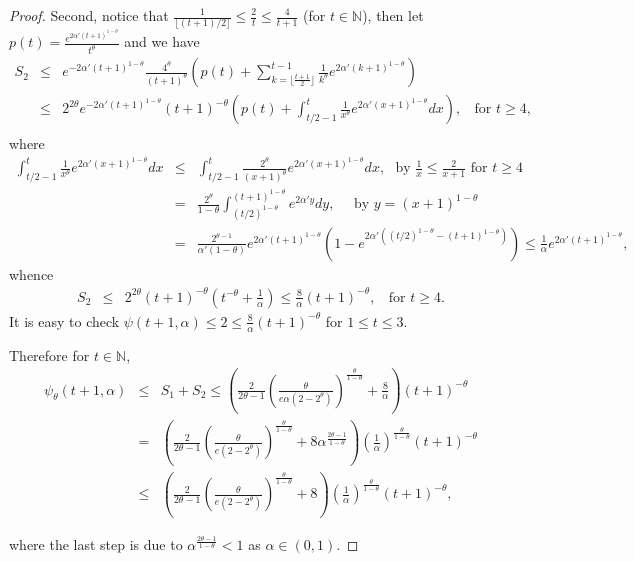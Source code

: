 \documentclass[twoside]{amsart}
\theoremstyle{theorem}
\theoremstyle{definition}
\theoremstyle{remark}
\def\N{{\mathbb N}}
\newcommand{\DS}{\displaystyle}
\begin{document}
\begin{proof}
Second,
notice that $\DS \frac{1}{\lfloor (t+1)/2 \rfloor} \leq \frac{2}{t} \leq \frac{4}{t+1}$ (for $t\in \N$),
then let $\DS p(t)=\frac{e^{2\alpha'(t+1)^{1-\theta}}}{t^\theta}$ and we have
\begin{eqnarray*}
S_2 & \leq & e^{-2 \alpha' (t+1)^{1-\theta}} \frac{4^\theta}{(t+1)^\theta}\left( p(t)+\sum_{k=\lfloor\frac{t+1}{2}\rfloor}^{t-1}
\frac{1}{k^{\theta}} e^{2\alpha'(k+1)^{1-\theta}} \right) \\
& \leq & 2^{2\theta} e^{-2 \alpha' (t+1)^{1-\theta}} (t+1)^{-\theta}\left( p(t)+\int_{t/2-1}^{t} \frac{1}{x^{\theta}} e^{2\alpha'(x+1)^{1-\theta}} d x\right),
\ \ \ \ \mbox{for $t\geq 4$}, \\
\end{eqnarray*}
where
\begin{eqnarray*}
\int_{t/2-1}^{t} \frac{1}{x^{\theta}} e^{2\alpha'(x+1)^{1-\theta}} d x & \leq &  \int_{t/2-1}^{t} \frac{2^\theta}{(x+1)^{\theta}}
e^{2\alpha'(x+1)^{1-\theta}} d x , \ \ \ \mbox{by $\DS \frac{1}{x}\leq \frac{2}{x+1}$ for $t\geq 4$} \\
& = & \frac{2^\theta}{1-\theta} \int_{(t/2)^{1-\theta}}^{(t+1)^{1-\theta}} e^{2\alpha'y} d y , \ \ \ \ \ \ \mbox{by $\DS y=(x+1)^{1-\theta}$} \\
& = & \frac{2^{\theta-1}}{\alpha'(1-\theta)} e^{2\alpha'(t+1)^{1-\theta}} \left(1- e^{2\alpha'((t/2)^{1-\theta}-(t+1)^{1-\theta})} \right) \leq
\frac{1}{\alpha} e^{2\alpha'(t+1)^{1-\theta}},
\end{eqnarray*}
whence
\begin{eqnarray*}
S_2 & \leq & 2^{2\theta}(t+1)^{-\theta} \left( t^{-\theta} + \frac{1}{\alpha} \right) \leq \frac{8}{\alpha} (t+1)^{-\theta}, \ \ \ \ \mbox{for $t\geq 4$}.
\end{eqnarray*}
It is easy to check $\DS \psi(t+1,\alpha)\leq 2 \leq \frac{8}{\alpha} (t+1)^{-\theta}$ for $1\leq t \leq 3$.

Therefore for $t\in \N$,
\begin{eqnarray*}
\psi_\theta(t+1,\alpha) & \leq & S_1 + S_2 \leq
\left(\frac{2}{2\theta-1} \left(\frac{\theta}{e\alpha(2-2^\theta)}
\right)^{\frac{\theta}{1-\theta}} +
\frac{8}{\alpha} \right) (t+1)^{-\theta} \\
& = & \left(\frac{2}{2\theta-1} \left(\frac{\theta}{e(2-2^\theta)}
\right)^{\frac{\theta}{1-\theta}} +
8\alpha^{\frac{2\theta-1}{1-\theta}} \right) \left( \frac{1}{\alpha}\right)^{\frac{\theta}{1-\theta}}(t+1)^{-\theta} \\
& \leq & \left(\frac{2}{2\theta-1} \left(\frac{\theta}{e(2-2^\theta)}
\right)^{\frac{\theta}{1-\theta}} +
8 \right) \left( \frac{1}{\alpha}\right)^{\frac{\theta}{1-\theta}}(t+1)^{-\theta},
\end{eqnarray*}

\noindent where the last step is due to $\alpha^{\frac{2\theta-1}{1-\theta}}<1$ as $\alpha\in (0,1)$.
\end{proof}
\end{document}
